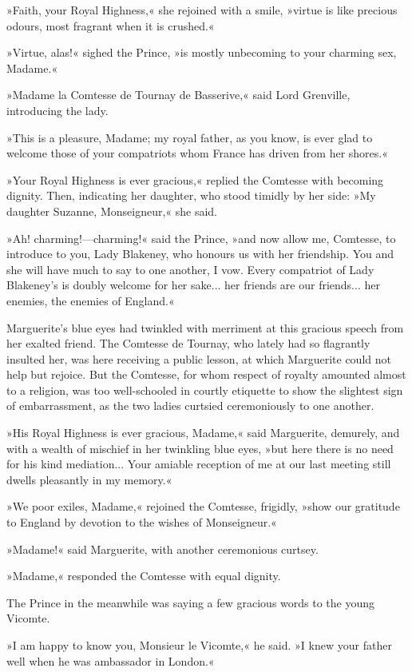 »Faith, your Royal Highness,« she rejoined with a smile, »virtue is like precious odours, most fragrant when it is crushed.«

»Virtue, alas!« sighed the Prince, »is mostly unbecoming to your charming sex, Madame.«

»Madame la Comtesse de Tournay de Basserive,« said Lord Grenville, introducing the lady.

»This is a pleasure, Madame; my royal father, as you know, is ever glad to welcome those of your compatriots whom France has driven from her shores.«

»Your Royal Highness is ever gracious,« replied the Comtesse with becoming dignity. Then, indicating her daughter, who stood timidly by her side: »My daughter Suzanne, Monseigneur,« she said.

»Ah! charming!\allowbreak---\allowbreak charming!« said the Prince, »and now allow me, Comtesse, to introduce to you, Lady Blakeney, who honours us with her friendship. You and she will have much to say to one another, I vow. Every compatriot of Lady Blakeney's is doubly welcome for her sake... her friends are our friends... her enemies, the enemies of England.«

Marguerite's blue eyes had twinkled with merriment at this gracious speech from her exalted friend. The Comtesse de Tournay, who lately had so flagrantly insulted her, was here receiving a public lesson, at which Marguerite could not help but rejoice. But the Comtesse, for whom respect of royalty amounted almost to a religion, was too well-schooled in courtly etiquette to show the slightest sign of embarrassment, as the two ladies curtsied ceremoniously to one another.

»His Royal Highness is ever gracious, Madame,« said Marguerite, demurely, and with a wealth of mischief in her twinkling blue eyes, »but here there is no need for his kind mediation... Your amiable reception of me at our last meeting still dwells pleasantly in my memory.«

»We poor exiles, Madame,« rejoined the Comtesse, frigidly, »show our gratitude to England by devotion to the wishes of Monseigneur.«

»Madame!« said Marguerite, with another ceremonious curtsey.

»Madame,« responded the Comtesse with equal dignity.

The Prince in the meanwhile was saying a few gracious words to the young Vicomte.

»I am happy to know you, Monsieur le Vicomte,« he said. »I knew your father well when he was ambassador in London.«

